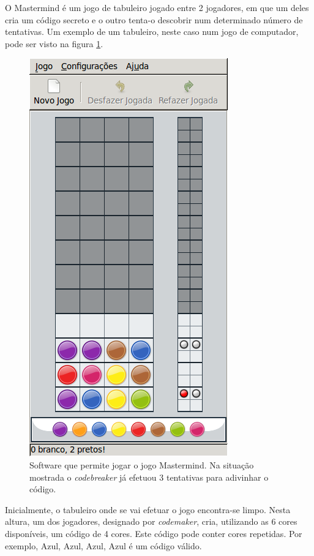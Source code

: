 
O Mastermind é um jogo de tabuleiro jogado entre 2 jogadores, em que
um deles cria um código secreto e o outro tenta-o descobrir num
determinado número de tentativas. Um exemplo de um tabuleiro, neste
caso num jogo de computador, pode ser visto na figura
\ref{fig:tabuleiro_mastermind}.

\begin{figure}[h!]
  \centering
    \includegraphics[scale=0.30]{gnome-mastermind.png}    
  \caption{Software que permite jogar o jogo Mastermind. Na situação
    mostrada o \emph{codebreaker} já efetuou 3 tentativas para adivinhar o código.}
  \label{fig:tabuleiro_mastermind}
\end{figure}



Inicialmente, o tabuleiro onde se vai efetuar o jogo encontra-se
limpo. Nesta altura, um dos jogadores, designado por \emph{codemaker}, cria,
utilizando as 6 cores disponíveis, um código de 4 cores. Este código
pode conter cores repetidas. Por exemplo, Azul, Azul, Azul, Azul é um
código válido.

